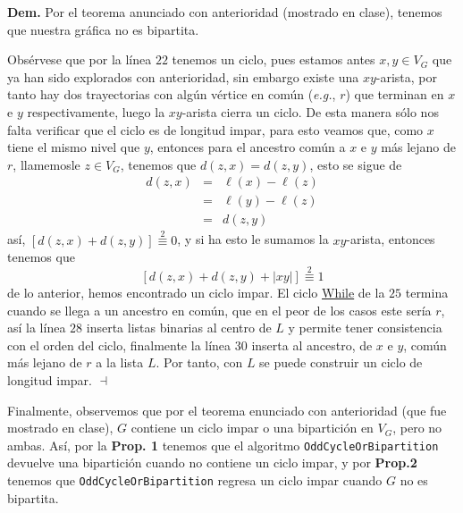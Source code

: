 \documentclass{article}
\newcommand{\code}[1]{\textcolor{white!25!black}{\texttt{#1}}}
\begin{document}
\textbf{Dem.} Por el teorema anunciado con anterioridad (mostrado en clase), tenemos
que nuestra gr\'afica no es bipartita.

Obs\'ervese que por la l\'inea $22$ tenemos un ciclo, pues estamos antes $x,y \in V_G$
que ya han sido explorados con anterioridad, sin embargo existe una $xy$-arista, por
tanto hay dos trayectorias con alg\'un v\'ertice en com\'un (\textit{e.g.}, $r$) que terminan
en $x$ e $y$ respectivamente, luego la $xy$-arista cierra un ciclo. De esta manera s\'olo
nos falta verificar que el ciclo es de longitud impar, para esto veamos que, como $x$ tiene
el mismo nivel que $y$, entonces para el ancestro com\'un a $x$ e $y$ m\'as lejano de $r$,
llamemosle $z \in V_G$, tenemos que $d(z,x) = d(z,y)$, esto se sigue de
\begin{eqnarray*}
  d(z,x) &=& \ell(x) - \ell(z)\\
  &=& \ell(y) - \ell(z)\\
  &=& d(z,y)
\end{eqnarray*}
as\'i, $[d(z,x) + d(z,y)] \stackrel{2}{\equiv}0$, y si ha esto le sumamos la $xy$-arista,
entonces tenemos que
\[
[d(z,x) + d(z,y) + |xy|] \stackrel{2}{\equiv}1
\]
de lo anterior, hemos encontrado un ciclo impar. El ciclo \underline{While} de la $25$
termina cuando se llega a un ancestro en com\'un, que en el peor de los casos este ser\'ia
$r$, as\'i la l\'inea $28$ inserta listas binarias al centro de $L$ y permite tener consistencia
con el orden del ciclo, finalmente la l\'inea $30$ inserta al ancestro, de $x$ e $y$, com\'un
m\'as lejano de $r$ a la lista $L$. Por tanto, con $L$ se puede construir un ciclo de
longitud impar.
\hfill $\dashv$

Finalmente, observemos que por el teorema enunciado con anterioridad (que fue mostrado en clase),
$G$ contiene un ciclo impar o una bipartici\'on en $V_G$, pero no ambas. As\'i, por la \textbf{Prop. 1}
tenemos que el algoritmo \code{OddCycleOrBipartition} devuelve una bipartici\'on cuando no contiene
un ciclo impar, y por \textbf{Prop.2} tenemos que \code{OddCycleOrBipartition} regresa un ciclo
impar cuando $G$ no es bipartita.
\end{document}

